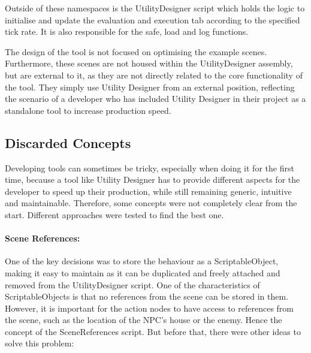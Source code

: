 Outside of these namespaces is the UtilityDesigner script which holds the logic to initialise and update the evaluation and execution tab according to the specified tick rate. It is also responsible for the safe, load and log functions.

The design of the tool is not focused on optimising the example scenes. Furthermore, these scenes are not housed within the UtilityDesigner assembly, but are external to it, as they are not directly related to the core functionality of the tool. They simply use Utility Designer from an external position, reflecting the scenario of a developer who has included Utility Designer in their project as a standalone tool to increase production speed.

\subsection{Discarded Concepts}
\label{sec:utilitydesigner_implementation_discardedconcepts}

Developing tools can sometimes be tricky, especially when doing it for the first time, because a tool like Utility Designer has to provide different aspects for the developer to speed up their production, while still remaining generic, intuitive and maintainable. Therefore, some concepts were not completely clear from the start. Different approaches were tested to find the best one.

\paragraph{Scene References:}
One of the key decisions was to store the behaviour as a ScriptableObject, making it easy to maintain as it can be duplicated and freely attached and removed from the UtilityDesigner script. One of the characteristics of ScriptableObjects is that no references from the scene can be stored in them. However, it is important for the action nodes to have access to references from the scene, such as the location of the NPC's house or the enemy. Hence the concept of the SceneReferences script. But before that, there were other ideas to solve this problem:

